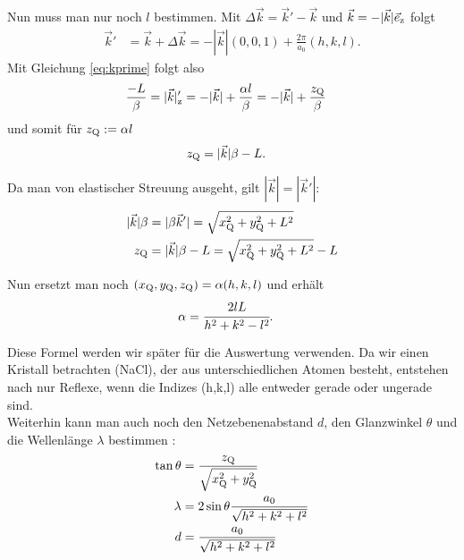 Nun muss man nur noch $l$ bestimmen. Mit $\Delta\vec{k} = \vec{k}' -\vec{k}$ und $\vec{k}=-|\vec{k}|\vec{e}_\mathrm{z}$ folgt
\begin{align*}
\vec{k}' &= \vec{k} + \Delta\vec{k} = -|\vec{k}| (0,0,1) + \frac{2\pi}{a_0} (h,k,l).
\end{align*}
Mit Gleichung \ref{eq:kprime} folgt also
\begin{align*}
\frac{-L}{\beta} = |\vec{k}|_\mathrm{z}' &= -|\vec{k}| +\frac{\alpha l}{\beta} = -|\vec{k}| + \frac{z_\mathrm{Q}}{\beta}
\end{align*}
und somit für $z_\mathrm{Q} := \alpha l$
\begin{align*} 
z_\mathrm{Q} &= |\vec{k}|\beta - L.
\end{align*}

Da man von elastischer Streuung ausgeht, gilt $|\vec{k}| = |\vec{k}'|$: 
\begin{align}
|\vec{k}|\beta &= |\beta\vec{k}'| = \sqrt{x_\mathrm{Q}^2 + y_\mathrm{Q}^2 + L^2} \nonumber\\
z_\mathrm{Q} &= |\vec{k}|\beta - L = \sqrt{x_\mathrm{Q}^2 + y_\mathrm{Q}^2 + L^2} - L
\label{eq:zq}
\end{align}

Nun ersetzt man noch $(x_\mathrm{Q}, y_\mathrm{Q}, z_\mathrm{Q}) = \alpha (h,k,l)$ und erhält
\begin{align}
\alpha &= \cfrac{2lL}{h^2 + k^2 - l^2}.
\label{eq:alpha}
\end{align}

Diese Formel werden wir später für die Auswertung verwenden. Da wir einen Kristall betrachten (NaCl), der aus unterschiedlichen Atomen besteht, entstehen nach \cite{ld} nur Reflexe, wenn  die Indizes (h,k,l) alle entweder gerade oder ungerade sind.\\

Weiterhin kann man auch noch den Netzebenenabstand $d$, den Glanzwinkel $\theta$ und die Wellenlänge $\lambda$ bestimmen \cite{ld}:
\begin{align}
\tan{\theta} &= \frac{z_\mathrm{Q}}{\sqrt{x_\mathrm{Q}^2+y_\mathrm{Q}^2}}\label{eq:theta}\\
\lambda &= 2\sin{\theta} \frac{a_0}{\sqrt{h^2+k^2+l^2}}\label{eq:lambda}\\
d &= \frac{a_0}{\sqrt{h^2+k^2+l^2}}\label{eq:d}
\end{align}
